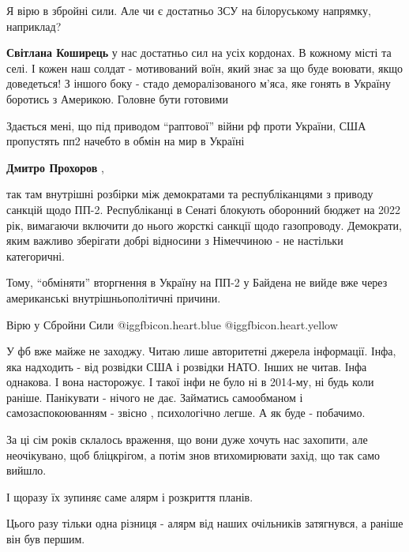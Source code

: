 \begin{itemize}
Я вірю в збройні сили. Але чи є достатньо ЗСУ на білоруському напрямку, наприклад?

\begin{itemize} %
\textbf{Світлана Коширець} у нас достатньо сил на усіх кордонах. В кожному місті та селі. І кожен наш солдат - мотивований воїн, який знає за що буде воювати, якщо доведеться! З іншого боку - стадо деморалізованого м’яса, яке гонять в Україну боротись з Америкою. Головне бути готовими
\end{itemize} %


Здається мені, що під приводом \enquote{раптової} війни рф проти України, США
пропустять пп2 начебто в обмін на мир в Україні

\begin{itemize} %
\textbf{Дмитро Прохоров} , 

так там внутрішні розбірки між демократами та республіканцями з приводу санкцій
щодо ПП-2. Республіканці в Сенаті блокують оборонний бюджет на 2022 рік,
вимагаючи включити до нього жорсткі санкції щодо газопроводу. Демократи, яким
важливо зберігати добрі відносини з Німеччиною - не настільки категоричні.

Тому, \enquote{обміняти} вторгнення в Україну на ПП-2 у Байдена не вийде вже
через американські внутрішньополітичні причини.

\end{itemize} %

Вірю у Сбройни Сили @igg{fbicon.heart.blue}  @igg{fbicon.heart.yellow} 


\obeycr
У фб вже майже не заходжу.
Читаю лише авторитетні джерела інформації.
Інфа, яка надходить - від розвідки США і розвідки НАТО. Інших не читав.
Інфа однакова. І вона насторожує.
І такої інфи не було ні в 2014-му, ні будь коли раніше.
Панікувати - нічого не дає.
Займатись самообманом і самозаспокоюванням - звісно , психологічно легше.
А як буде - побачимо.
\restorecr


За ці сім років склалось враження, що вони дуже хочуть нас захопити, але
неочікувано, щоб бліцкрігом, а потім знов втихомирювати захід, що так само
вийшло.

І щоразу їх зупиняє саме алярм і розкриття планів.

Цього разу тільки одна різниця - алярм від наших очільників затягнувся, а
раніше він був першим.


\end{itemize}
